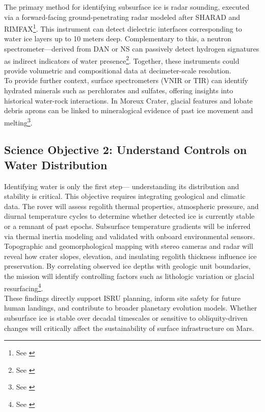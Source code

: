 The primary method for identifying subsurface ice is radar sounding, executed via a forward-facing ground-penetrating radar modeled after SHARAD and RIMFAX\footnote{See \cite{plaut_2007_subsurface, putzig_2012_stratigraphy}}. This instrument can detect dielectric interfaces corresponding to water ice layers up to 10 meters deep. Complementary to this, a neutron spectrometer—derived from DAN or NS can passively detect hydrogen signatures as indirect indicators of water presence\footnote{See \cite{nasa_rad}}. Together, these instruments could provide volumetric and compositional data at decimeter-scale resolution. \\

To provide further context, surface spectrometers (VNIR or TIR) can identify hydrated minerals such as perchlorates and sulfates, offering insights into historical water-rock interactions. In Moreux Crater, glacial features and lobate debris aprons can be linked to mineralogical evidence of past ice movement and melting\footnote{See \cite{bramson_2015_excess, mellon_1995_ground_ice}}.

\subsection*{Science Objective 2: Understand Controls on Water Distribution}

Identifying water is only the first step— understanding its distribution and stability is critical. This objective requires integrating geological and climatic data. The rover will assess regolith thermal properties, atmospheric pressure, and diurnal temperature cycles to determine whether detected ice is currently stable or a remnant of past epochs. Subsurface temperature gradients will be inferred via thermal inertia modeling and validated with onboard environmental sensors. \\

Topographic and geomorphological mapping with stereo cameras and radar will reveal how crater slopes, elevation, and insulating regolith thickness influence ice preservation. By correlating observed ice depths with geologic unit boundaries, the mission will identify controlling factors such as lithologic variation or glacial resurfacing\footnote{See \cite{head_2010_glaciation}}. \\

These findings directly support ISRU planning, inform site safety for future human landings, and contribute to broader planetary evolution models. Whether subsurface ice is stable over decadal timescales or sensitive to obliquity-driven changes will critically affect the sustainability of surface infrastructure on Mars.

